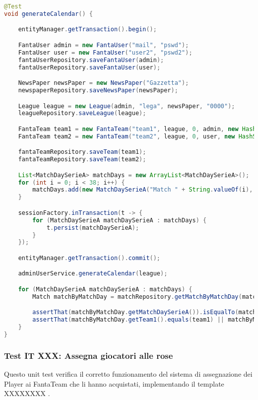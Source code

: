 \begin{lstlisting}[language=Java]
@Test
void generateCalendar() {

	entityManager.getTransaction().begin();

	FantaUser admin = new FantaUser("mail", "pswd");
	FantaUser user = new FantaUser("user2", "pswd2");
	fantaUserRepository.saveFantaUser(admin);
	fantaUserRepository.saveFantaUser(user);

	NewsPaper newsPaper = new NewsPaper("Gazzetta");
	newspaperRepository.saveNewsPaper(newsPaper);

	League league = new League(admin, "lega", newsPaper, "0000");
	leagueRepository.saveLeague(league);

	FantaTeam team1 = new FantaTeam("team1", league, 0, admin, new HashSet<Contract>());
	FantaTeam team2 = new FantaTeam("team2", league, 0, user, new HashSet<Contract>());

	fantaTeamRepository.saveTeam(team1);
	fantaTeamRepository.saveTeam(team2);

	List<MatchDaySerieA> matchDays = new ArrayList<MatchDaySerieA>();
	for (int i = 0; i < 38; i++) {
		matchDays.add(new MatchDaySerieA("Match " + String.valueOf(i), LocalDate.of(2025, 9, 7).plusWeeks(i)));
	}

    sessionFactory.inTransaction(t -> {
		for (MatchDaySerieA matchDaySerieA : matchDays) {
			t.persist(matchDaySerieA);
		}
	});

	entityManager.getTransaction().commit();

    adminUserService.generateCalendar(league);

	for (MatchDaySerieA matchDaySerieA : matchDays) {
		Match matchByMatchDay = matchRepository.getMatchByMatchDay(matchDaySerieA, league, team1);

		assertThat(matchByMatchDay.getMatchDaySerieA()).isEqualTo(matchDaySerieA);
		assertThat(matchByMatchDay.getTeam1().equals(team1) || matchByMatchDay.getTeam2().equals(team1)).isTrue();
	}
}
\end{lstlisting}


\subsubsection{Test IT XXX: Assegna giocatori alle rose}

Questo unit test verifica il corretto funzionamento del sistema di assegnazione dei Player ai FantaTeam che li hanno acquistati,
implementando il template XXXXXXXX .

